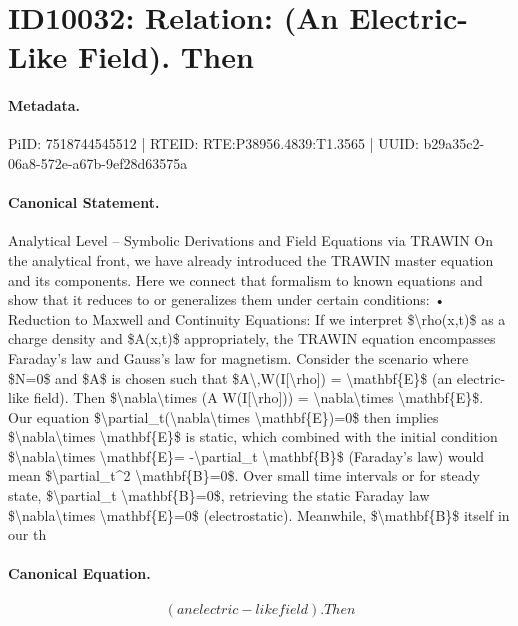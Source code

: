 \section*{ID10032: Relation: (An Electric-Like Field). Then}
\paragraph{Metadata.}
PiID: 7518744545512 | RTEID: RTE:P38956.4839:T1.3565 | UUID: b29a35c2-06a8-572e-a67b-9ef28d63575a

\paragraph{Canonical Statement.}
Analytical Level – Symbolic Derivations and Field Equations via TRAWIN On the analytical front, we have already introduced the TRAWIN master equation and its components. Here we connect that formalism to known equations and show that it reduces to or generalizes them under certain conditions: • Reduction to Maxwell and Continuity Equations: If we interpret \$\textbackslash{}rho(x,t)\$ as a charge density and \$A(x,t)\$ appropriately, the TRAWIN equation encompasses Faraday’s law and Gauss’s law for magnetism. Consider the scenario where \$N=0\$ and \$A\$ is chosen such that \$A\textbackslash{},W(I[\textbackslash{}rho]) = \textbackslash{}mathbf\{E\}\$ (an electric-like field). Then \$\textbackslash{}nabla\textbackslash{}times (A W(I[\textbackslash{}rho])) = \textbackslash{}nabla\textbackslash{}times \textbackslash{}mathbf\{E\}\$. Our equation \$\textbackslash{}partial\_t(\textbackslash{}nabla\textbackslash{}times \textbackslash{}mathbf\{E\})=0\$ then implies \$\textbackslash{}nabla\textbackslash{}times \textbackslash{}mathbf\{E\}\$ is static, which combined with the initial condition \$\textbackslash{}nabla\textbackslash{}times \textbackslash{}mathbf\{E\}= -\textbackslash{}partial\_t \textbackslash{}mathbf\{B\}\$ (Faraday’s law) would mean \$\textbackslash{}partial\_t\textasciicircum{}2 \textbackslash{}mathbf\{B\}=0\$. Over small time intervals or for steady state, \$\textbackslash{}partial\_t \textbackslash{}mathbf\{B\}=0\$, retrieving the static Faraday law \$\textbackslash{}nabla\textbackslash{}times \textbackslash{}mathbf\{E\}=0\$ (electrostatic). Meanwhile, \$\textbackslash{}mathbf\{B\}\$ itself in our th

\paragraph{Canonical Equation.}
\[
(an electric-like field). Then
\]

